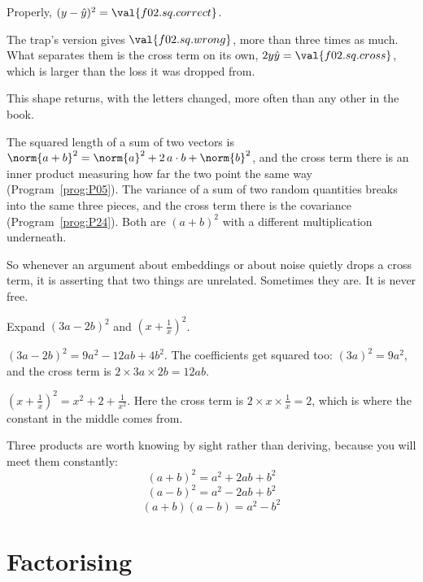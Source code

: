 \begin{fr}
\begin{ansblock}
Properly, $(y - \hat{y})^{2} = \val{f02.sq.correct}$.

The trap's version gives $\val{f02.sq.wrong}$, more than three times as much.
What separates them is the cross term on its own,
$2y\hat{y} = \val{f02.sq.cross}$, which is larger than the loss it was dropped
from.
\end{ansblock}

\begin{aibox}
This shape returns, with the letters changed, more often than any other in the
book.

The squared length of a sum of two vectors is
$\norm{a + b}^{2} = \norm{a}^{2} + 2\,a \cdot b + \norm{b}^{2}$, and the cross
term there is an inner product measuring how far the two point the same way
(Program~\ref{prog:P05}). The variance of a sum of two random quantities breaks
into the same three pieces, and the cross term there is the covariance
(Program~\ref{prog:P24}). Both are $(a+b)^{2}$ with a different multiplication
underneath.

So whenever an argument about embeddings or about noise quietly drops a cross
term, it is asserting that two things are unrelated. Sometimes they are. It is
never free.
\end{aibox}

\yourturn
Expand $(3a - 2b)^{2}$ and $\left(x + \frac{1}{x}\right)^{2}$.
\dotline
\nextframe
\end{fr}

\begin{fr}
\begin{ansblock}
$(3a - 2b)^{2} = 9a^{2} - 12ab + 4b^{2}$. The coefficients get squared too:
$(3a)^{2} = 9a^{2}$, and the cross term is $2 \times 3a \times 2b = 12ab$.

$\left(x + \frac{1}{x}\right)^{2} = x^{2} + 2 + \frac{1}{x^{2}}$. Here the
cross term is $2 \times x \times \frac{1}{x} = 2$, which is where the constant
in the middle comes from.
\end{ansblock}

Three products are worth knowing by sight rather than deriving, because you
will meet them constantly:
\[ (a+b)^{2} = a^{2} + 2ab + b^{2} \]
\[ (a-b)^{2} = a^{2} - 2ab + b^{2} \]
\[ (a+b)(a-b) = a^{2} - b^{2} \]
\end{fr}

\section{Factorising}
\label{sec:F02-factorising}

